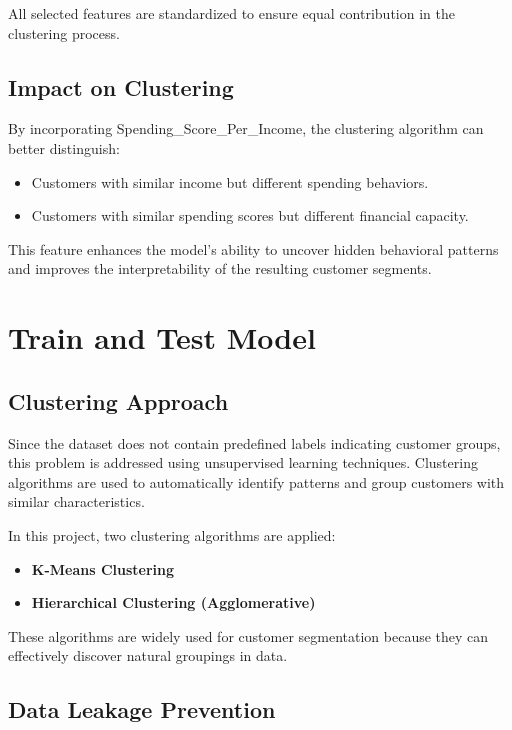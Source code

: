 \documentclass[12pt,a4paper]{article}
\begin{document}
All selected features are standardized to ensure equal contribution in the clustering process.

\subsection{Impact on Clustering}

By incorporating Spending\_Score\_Per\_Income, the clustering algorithm can better distinguish:

\begin{itemize}
    \item Customers with similar income but different spending behaviors.
    \item Customers with similar spending scores but different financial capacity.
\end{itemize}

This feature enhances the model's ability to uncover hidden behavioral patterns and improves the interpretability of the resulting customer segments.


\section{Train and Test Model}

\subsection{Clustering Approach}

Since the dataset does not contain predefined labels indicating customer groups, this problem is addressed using unsupervised learning techniques. Clustering algorithms are used to automatically identify patterns and group customers with similar characteristics.

In this project, two clustering algorithms are applied:

\begin{itemize}
    \item \textbf{K-Means Clustering}
    \item \textbf{Hierarchical Clustering (Agglomerative)}
\end{itemize}

These algorithms are widely used for customer segmentation because they can effectively discover natural groupings in data.

\subsection{Data Leakage Prevention}
\end{document}
